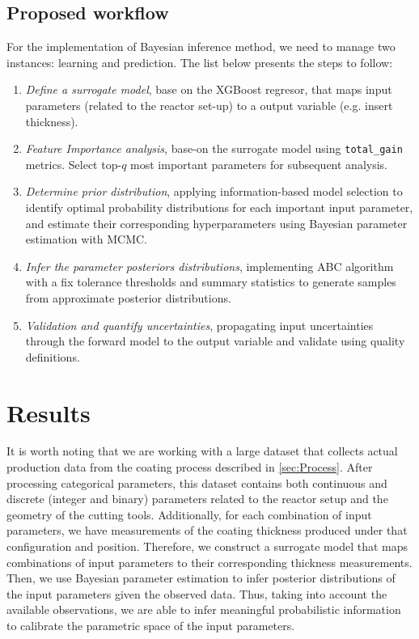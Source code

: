 \documentclass{article}
\begin{document}
		
		
	\subsection{Proposed workflow}\label{Sec:workflow}
		
	For the implementation of Bayesian inference method, we need to manage two instances: learning and prediction. The list below presents the steps to follow:
	\begin{enumerate}
		\item \textit{Define a surrogate model}, base on the XGBoost regresor, that maps input parameters (related to the reactor set-up) to a output variable (e.g. insert thickness).
		\item \textit{Feature Importance analysis}, base-on the surrogate model using \texttt{total\_gain} metrics.  Select top-$q$ most important parameters for subsequent analysis. %
		\item \textit{Determine prior distribution}, applying information-based model selection to identify optimal probability distributions for each important input parameter, and estimate their corresponding hyperparameters using Bayesian parameter estimation with MCMC.
		\item \textit{Infer the parameter posteriors distributions}, implementing ABC algorithm with a fix tolerance thresholds and summary statistics to generate samples from approximate posterior distributions.
		\item \textit{Validation and quantify uncertainties}, propagating input uncertainties through the forward model to the output variable and validate using quality definitions.
	\end{enumerate}
	
	
	
	\section{Results}\label{Results}
	
	It is worth noting that we are working with a large dataset that collects actual production data from the coating process described in \cref{sec:Process}. After processing categorical parameters, this dataset contains both continuous and discrete (integer and binary) parameters related to the reactor setup and the geometry of the cutting tools. Additionally, for each combination of input parameters, we have measurements of the coating thickness produced under that configuration and position. Therefore, we construct a surrogate model that maps combinations of input parameters to their corresponding thickness measurements. Then, we use Bayesian parameter estimation to infer posterior distributions of the input parameters given the observed data. Thus, taking into account the available observations, we are able to infer meaningful probabilistic information to calibrate the parametric space of the input parameters.
	
\end{document}
